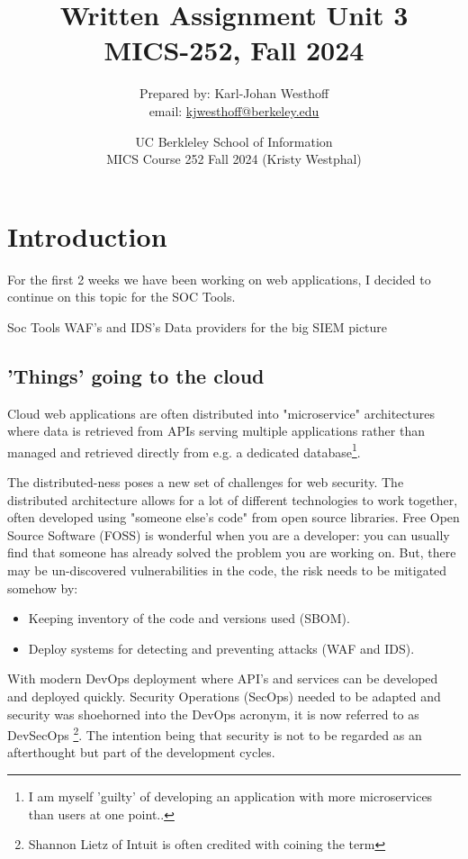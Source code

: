 \documentclass[
	letterpaper, %
	10pt, %
	unnumberedsections, %
	twoside, %
]{APAAssignment}
\title{Written Assignment Unit 3 \\ MICS-252, Fall 2024} %
\date{UC Berkleley School of Information \\
MICS Course 252 Fall 2024 (Kristy Westphal)
}
\author{
	Prepared by: Karl-Johan Westhoff \\
	email: \href{mailto:kjwesthoff@berkeley.edu}{kjwesthoff@berkeley.edu}
}
\begin{document}
\onecolumn
\maketitle %


\section{Introduction}
For the first 2 weeks we have been working on web applications, I decided to continue on this topic for the SOC Tools. 



Soc Tools
WAF's and IDS's Data providers for the big SIEM picture 

\subsection{'Things' going to the cloud}
Cloud web applications are often distributed into "microservice" architectures where data is retrieved from APIs serving multiple applications rather than managed and retrieved directly from e.g. a dedicated database\footnote{I am myself 'guilty' of developing an application with more microservices than users at one point..}. 

The distributed-ness poses a new set of challenges for web security. The distributed architecture allows for a lot of different technologies to work together, often developed using "someone else's code" from open source libraries. Free Open Source Software (FOSS) is wonderful when you are a developer: you can usually find that someone has already solved the problem you are working on. But, there may be un-discovered vulnerabilities in the code, the risk needs to be mitigated somehow by:

\begin{itemize}
	\item Keeping inventory of the code and versions used (SBOM). 
	\item Deploy systems for detecting and preventing attacks (WAF and IDS).
\end{itemize}

With modern DevOps deployment where API's and services can be developed and deployed quickly. Security Operations (SecOps) needed to be adapted and security was shoehorned into the DevOps acronym, it is now referred to as DevSecOps \footnote{Shannon Lietz of Intuit is often credited with coining the term\cite{DevSecOps}}. The intention being that security is not to be regarded as an afterthought but part of the development cycles.  
\end{document}
